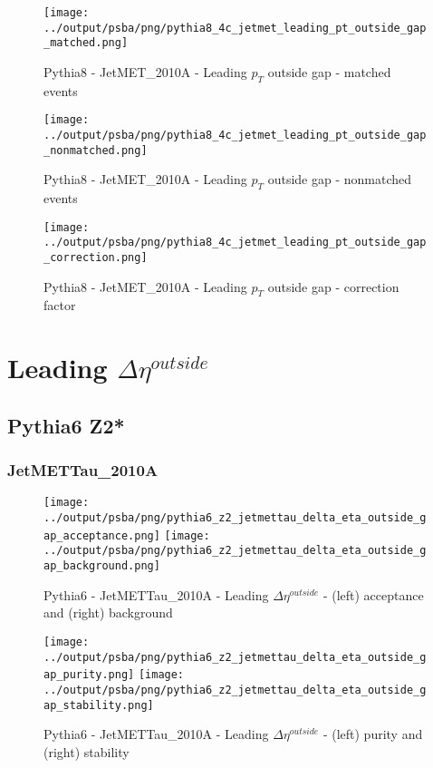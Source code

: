 \documentclass[11pt]{book}
\begin{document}
\begin{figure}[ht]
\centering
\texttt{[image: ../output/psba/png/pythia8\_4c\_jetmet\_leading\_pt\_outside\_gap\_matched.png]}
\caption{Pythia8 - JetMET\_2010A - Leading $p_{T}$ outside gap - matched events}
\label{fig:p8_jetmet_leading_pt_outside_gap_matched}
\end{figure}

\begin{figure}[ht]
\centering
\texttt{[image: ../output/psba/png/pythia8\_4c\_jetmet\_leading\_pt\_outside\_gap\_nonmatched.png]}
\caption{Pythia8 - JetMET\_2010A - Leading $p_{T}$ outside gap - nonmatched events}
\label{fig:p8_jetmet_leading_pt_outside_gap_nonmatched}
\end{figure}

\begin{figure}[ht]
\centering
\texttt{[image: ../output/psba/png/pythia8\_4c\_jetmet\_leading\_pt\_outside\_gap\_correction.png]}
\caption{Pythia8 - JetMET\_2010A - Leading $p_{T}$ outside gap - correction factor}
\label{fig:p8_jetmet_leading_pt_outside_gap_correction}
\end{figure}



\clearpage
\chapter{Leading $\Delta\eta^{outside}$}
\section{Pythia6 Z2*}
\subsection{JetMETTau\_2010A}

\begin{figure}[ht]
\centering
\texttt{[image: ../output/psba/png/pythia6\_z2\_jetmettau\_delta\_eta\_outside\_gap\_acceptance.png]}
\texttt{[image: ../output/psba/png/pythia6\_z2\_jetmettau\_delta\_eta\_outside\_gap\_background.png]}
\caption{Pythia6 - JetMETTau\_2010A - Leading $\Delta\eta^{outside}$ - (left) acceptance and (right) background}
\label{fig:p6_jetmettau_delta_eta_outside_gap_ab}
\end{figure}

\begin{figure}[ht]
\centering
\texttt{[image: ../output/psba/png/pythia6\_z2\_jetmettau\_delta\_eta\_outside\_gap\_purity.png]}
\texttt{[image: ../output/psba/png/pythia6\_z2\_jetmettau\_delta\_eta\_outside\_gap\_stability.png]}
\caption{Pythia6 - JetMETTau\_2010A - Leading $\Delta\eta^{outside}$ - (left) purity and (right) stability}
\label{fig:p6_jetmettau_delta_eta_outside_gap_ps}
\end{figure}
\end{document}

